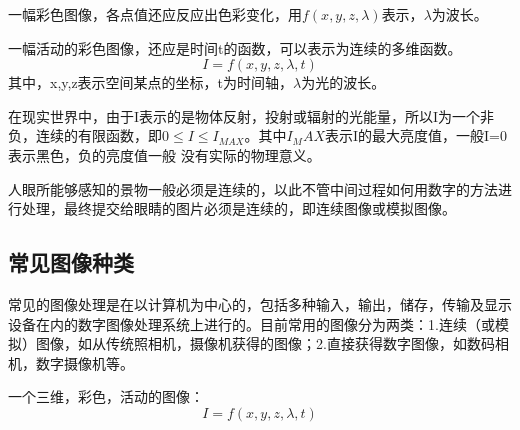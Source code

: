 \documentclass[11pt]{article}
\begin{document}
一幅彩色图像，各点值还应反应出色彩变化，用$f(x,y,z,\lambda)$表示，$\lambda$为波长。

一幅活动的彩色图像，还应是时间t的函数，可以表示为连续的多维函数。
$$I = f(x,y,z,\lambda,t)$$
其中，x,y,z表示空间某点的坐标，t为时间轴，$\lambda$为光的波长。

在现实世界中，由于I表示的是物体反射，投射或辐射的光能量，所以I为一个非负，连续的有限函数，即$0\le I\le I_{MAX}$。其中$I_MAX$表示I的最大亮度值，一般I=0表示黑色，负的亮度值一般 没有实际的物理意义。 

人眼所能够感知的景物一般必须是连续的，以此不管中间过程如何用数字的方法进行处理，最终提交给眼睛的图片必须是连续的，即连续图像或模拟图像。
\subsection{常见图像种类}

常见的图像处理是在以计算机为中心的，包括多种输入，输出，储存，传输及显示设备在内的数字图像处理系统上进行的。目前常用的图像分为两类：1.连续（或模拟）图像，如从传统照相机，摄像机获得的图像；2.直接获得数字图像，如数码相机，数字摄像机等。

\begin{figure}[h]
	\centering
\end{figure}
一个三维，彩色，活动的图像：
$$I = f(x,y,z,\lambda,t)$$
\end{document}
